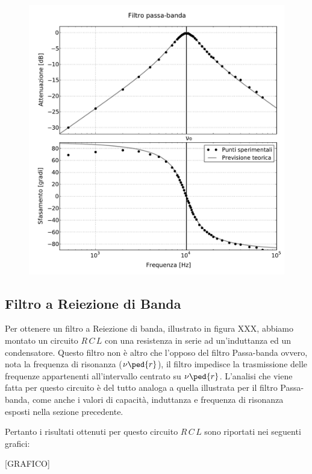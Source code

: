 \begin{figure}
  \includegraphics[scale=0.5]{passa_banda.pdf}
\end{figure}

\subsection*{Filtro a Reiezione di Banda}

Per ottenere un filtro a Reiezione di banda, illustrato in figura XXX, abbiamo montato un circuito $R\,C\,L$ con una resistenza in serie ad un'induttanza ed un condensatore.
Questo filtro non è altro che l'opposo del filtro Passa-banda ovvero, nota la frequenza di risonanza ($\nu\ped{r}$), il filtro impedisce la trasmissione delle frequenze appartenenti all'intervallo centrato su $\nu\ped{r}$. L'analisi che viene fatta per questo circuito è del tutto analoga a quella illustrata per il filtro Passa-banda, come anche i valori di capacità, induttanza e frequenza di risonanza esposti nella sezione precedente.

Pertanto i risultati ottenuti per questo circuito $R\,C\,L$ sono riportati nei seguenti grafici:

[GRAFICO]
